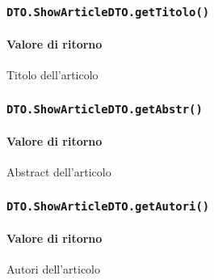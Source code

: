 \subsubsection{\texttt{DTO.ShowArticleDTO.getTitolo()}}
\paragraph{Valore di ritorno}
\begin{description}
\item Titolo dell'articolo
\end{description}
\subsubsection{\texttt{DTO.ShowArticleDTO.getAbstr()}}
\paragraph{Valore di ritorno}
\begin{description}
\item Abstract dell'articolo
\end{description}
\subsubsection{\texttt{DTO.ShowArticleDTO.getAutori()}}
\paragraph{Valore di ritorno}
\begin{description}
\item Autori dell'articolo
\end{description}



